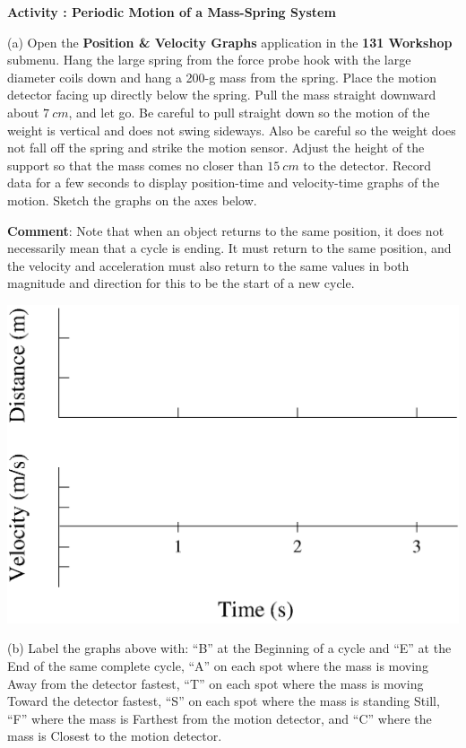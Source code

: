 \textbf{Activity  : Periodic Motion of a Mass-Spring System}

(a) Open the \textbf{Position \& Velocity Graphs} application in the \textbf{131 Workshop} submenu. 
Hang the large spring from the force probe hook with the
large diameter coils down and hang a 200-g mass from the spring. 
Place the motion detector facing up directly below the spring. 
Pull the mass straight downward about $7~ cm$, and let go.
Be careful to pull straight down so the motion of the weight is vertical and does not
swing sideways. 
Also be careful so the weight does not fall off the spring and strike the motion sensor.
Adjust the height of the support so that the mass comes no closer than $15~cm$ to the detector. 
Record data for a few seconds to display
position-time and velocity-time graphs of the motion. Sketch the graphs on the  axes below.

\textbf{Comment}: Note that when an object returns to the same position, it does not
necessarily mean that a cycle is ending. It must return to the same position,
and the velocity and acceleration must also return to the same values in both
magnitude and direction for this to be the start of a new cycle.

\vspace{0.3cm}
{\par\centering \includegraphics{periodic_motion/periodic_motion_fig1b.eps} \par}
\vspace{0.3cm}

(b) Label the graphs above with: ``B'' at the Beginning of a
cycle and ``E'' at the End of the same complete cycle, ``A''
on each spot where the mass is moving Away from the detector fastest, ``T''
on each spot where the mass is moving Toward the detector fastest, ``S''
on each spot where the mass is standing Still, ``F'' where the
mass is Farthest from the motion detector, and ``C'' where the mass
is Closest to the motion detector.

